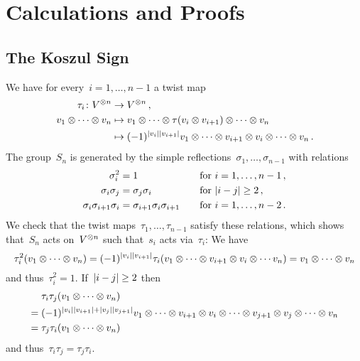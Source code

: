 \documentclass[a4paper,10pt,headings=standardclasses]{scrartcl}
\begin{document}
\section{Calculations and Proofs}


\subsection{The Koszul Sign}
\label{koszul sign proof}

We have for every~$i = 1, \dotsc, n-1$ a twist map
\begin{align*}
  \tau_i
  \colon
  V^{\otimes n}
  &\to
  V^{\otimes n} \,,
  \\
  v_1 \otimes \dotsb \otimes v_n
  &\mapsto
  v_1 \otimes \dotsb \otimes \tau(v_i \otimes v_{i+1}) \otimes \dotsb \otimes v_n
  \\
  &\mapsto
  (-1)^{\lvert v_i\rvert \lvert v_{i+1}\rvert}
  v_1 \otimes \dotsb \otimes v_{i+1} \otimes v_i \otimes \dotsb \otimes v_n \,.
\end{align*}
The group~$S_n$ is generated by the simple reflections~$\sigma_1, \dotsc, \sigma_{n-1}$ with relations
\begin{alignat*}{2}
  \sigma_i^2
  &=
  1
  &
  \quad
  &\text{for~$i = 1, \dotsc, n-1$} \,,
  \\
  \sigma_i \sigma_j
  &=
  \sigma_j \sigma_i
  &
  \quad
  &\text{for~$\lvert i-j\rvert \geq 2$} \,,
  \\
  \sigma_i \sigma_{i+1} \sigma_i
  &=
  \sigma_{i+1} \sigma_i \sigma_{i+1}
  &
  \quad
  &\text{for~$i = 1, \dotsc, n-2$} \,.
\end{alignat*}
We check that the twist maps~$\tau_1, \dotsc, \tau_{n-1}$ satisfy these relations, which shows that~$S_n$ acts on~$V^{\otimes n}$ such that~$s_i$ acts via~$\tau_i$:
We have
\[
  \tau_i^2(v_1 \otimes \dotsb \otimes v_n)
  =
  (-1)^{\lvert v_i\rvert \lvert v_{i+1}\rvert}
  \tau_i(v_1 \otimes \dotsb \otimes v_{i+1} \otimes v_i \otimes \dotsb v_n)
  =
  v_1 \otimes \dotsb \otimes v_n
\]
and thus~$\tau_i^2 = 1$.
If~$\lvert i-j\rvert \geq 2$ then
\begin{align*}
  {}&
  \tau_i \tau_j (v_1 \otimes \dotsb \otimes v_n)
  \\
  ={}&
  (-1)^{\lvert v_i\rvert \lvert v_{i+1}\rvert + \lvert v_j\rvert \lvert v_{j+1}\rvert}
          v_1
  \otimes \dotsb
  \otimes v_{i+1} \otimes v_i
  \otimes \dotsb
  \otimes v_{j+1} \otimes v_j
  \otimes \dotsb
  \otimes v_n
  \\
  ={}&
  \tau_j \tau_i (v_1 \otimes \dotsb \otimes v_n)
\end{align*}
and thus~$\tau_i \tau_j = \tau_j \tau_i$.
\end{document}
